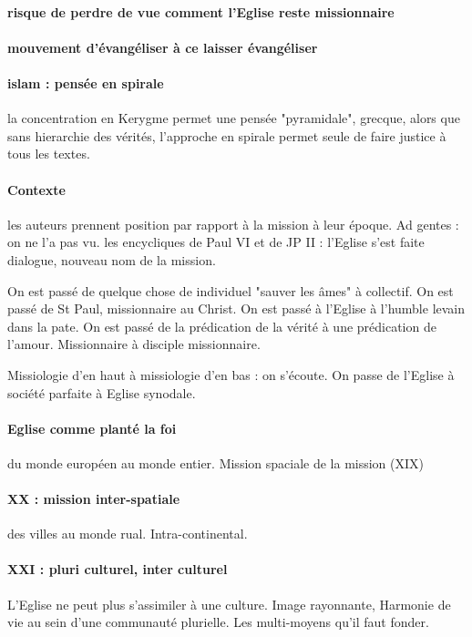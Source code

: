 \paragraph{risque de perdre de vue comment l'Eglise reste missionnaire} 

\paragraph{mouvement d'évangéliser à ce laisser évangéliser}


\paragraph{islam : pensée en spirale} la concentration en Kerygme permet une pensée "pyramidale", grecque, alors que sans hierarchie des vérités, l'approche en spirale permet seule de faire justice à tous les textes. 


\paragraph{Contexte} les auteurs prennent position par rapport à la mission à leur époque. Ad gentes : on ne l'a pas vu. les encycliques de Paul VI et de JP II : l'Eglise s'est faite dialogue, nouveau nom de la mission. 


On est passé de quelque chose de individuel "sauver les âmes" à collectif.
On est passé de St Paul, missionnaire au Christ.
On est passé à l'Eglise à l'humble levain dans la pate.
On est passé de la prédication de la vérité à une prédication de l'amour. 
Missionnaire à disciple missionnaire.


Missiologie d'en haut à missiologie d'en bas : on s'écoute.
On passe de l'Eglise à société parfaite à Eglise synodale.


\paragraph{Eglise comme planté la foi} du monde européen au monde entier. Mission spaciale de la mission (XIX)

\paragraph{XX : mission inter-spatiale} des villes au monde rual. Intra-continental.

\paragraph{XXI : pluri culturel, inter culturel} L'Eglise ne peut plus s'assimiler à une culture. Image rayonnante, Harmonie de vie au sein d'une communauté plurielle.
Les multi-moyens qu'il faut fonder. 